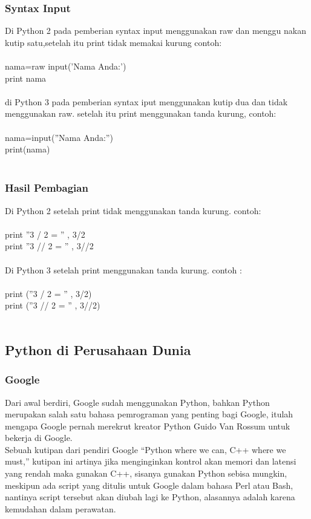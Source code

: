 \documentclass[12pt, times new roman, a4paper]{article}
\begin{document}
\subsubsection{Syntax Input}
Di Python 2 pada pemberian syntax input menggunakan raw dan menggu
nakan kutip satu,setelah itu print tidak memakai kurung contoh:\\
\\
nama=raw input(’Nama Anda:’)\\
print nama\\
\\
di Python 3 pada pemberian syntax iput menggunakan kutip dua dan tidak
menggunakan raw. setelah itu print menggunakan tanda kurung, contoh:\\
\\
nama=input(”Nama Anda:”)\\
print(nama)\\
\\
\subsubsection{Hasil Pembagian}
Di Python 2 setelah print tidak menggunakan tanda kurung. contoh:\\
\\
print ”3 / 2 = ” , 3/2\\
print ”3 // 2 = ” , 3//2\\
\\
Di Python 3 setelah print menggunakan tanda kurung. contoh :\\
\\
print (”3 / 2 = ” , 3/2)\\
print (”3 // 2 = ” , 3//2)\\
\\
\subsection{Python di Perusahaan Dunia}
\subsubsection{Google}
Dari awal berdiri, Google sudah menggunakan Python, bahkan Python merupakan salah satu bahasa pemrograman yang penting bagi Google, itulah mengapa Google pernah merekrut kreator Python Guido Van Rossum untuk bekerja di Google.\\

\noindent Sebuah kutipan dari pendiri Google “Python where we can, C++ where we must,” kutipan ini artinya jika menginginkan kontrol akan memori dan latensi yang rendah maka gunakan C++, sisanya gunakan Python sebisa mungkin, meskipun ada script yang ditulis untuk Google dalam bahasa Perl atau Bash, nantinya script tersebut akan diubah lagi ke Python, alasannya adalah karena kemudahan dalam perawatan.\\
\end{document}
